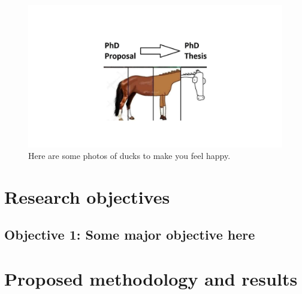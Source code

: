\documentclass[12pt]{article}
\numberwithin{equation}{section}
\begin{document}
\begin{figure}[ht]
\begin{center}
    \includegraphics[width=\textwidth, trim={6cm 5cm 6cm 5cm},clip,page=2] {proposal_figures.pdf}
    \caption{Here are some photos of ducks to make you feel happy.}
    \label{fig:ducks}
\end{center}
\end{figure}








\section{Research objectives}       %

\blindtext


\subsection*{Objective 1: Some major objective here}

\blindtext







\section{Proposed methodology and results} %
\end{document}
